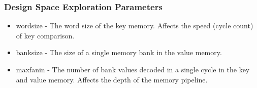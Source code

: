 \frametitle{Design Space Exploration Parameters}

\begin{itemize}
    \item wordsize - The word size of the key memory. Affects the speed
        (cycle count) of key comparison.
    \item banksize - The size of a single memory bank in the value memory.
    \item maxfanin - The number of bank values decoded in a single cycle in
        the key and value memory. Affects the depth of the memory pipeline.
\end{itemize}
